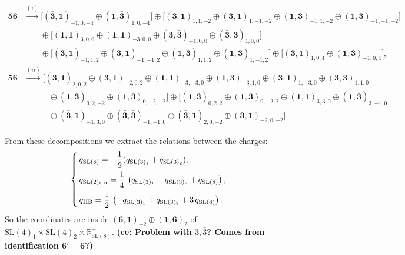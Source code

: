 \documentclass[11pt]{article}
\newcommand{\SL}{\ensuremath{\mathrm{SL}}\xspace}
\newcommand{\R}{\ensuremath{\mathbb{R}}\xspace}
\newcommand{\ce}[1]{\marginpar{\parbox{\marginparwidth}{\boldmath $\Longleftarrow$}}
{\boldmath\bfseries (ce: #1)}}
\begin{document}
  \begin{equation}
    \begin{aligned}
    \bm{56} &\overset{(i)}{\longrightarrow} \Big[(\bm{\bar{3}},\bm{1})_{-1,0,-4} \oplus (\bm{1},\bm{\bar{3}})_{1,0,-4}\Big] \oplus \Big[(\bm{3},\bm{1})_{1,1,-2} \oplus (\bm{3},\bm{1})_{1,-1,-2} \oplus (\bm{1},\bm{3})_{-1,1,-2} \oplus (\bm{1},\bm{3})_{-1,-1,-2}\Big] \\
    &\qquad \oplus \Big[(\bm{1},\bm{1})_{3,0,0} \oplus (\bm{1},\bm{1})_{-3,0,0} \oplus (\bm{3},\bm{\bar{3}})_{-1,0,0} \oplus (\bm{\bar{3}},\bm{3})_{1,0,0}\Big] \\
    &\qquad \oplus \Big[(\bm{\bar{3}},\bm{1})_{-1,1,2} \oplus (\bm{\bar{3}},\bm{1})_{-1,-1,2} \oplus (\bm{1},\bm{\bar{3}})_{1,1,2} \oplus (\bm{1},\bm{\bar{3}})_{1,-1,2}\Big] \oplus \Big[(\bm{3},\bm{1})_{1,0,4} \oplus (\bm{1},\bm{3})_{-1,0,4}\Big],\\[10pt]
    \bm{56} &\overset{(ii)}{\longrightarrow} \Big[(\bm{\bar{3}},\bm{1})_{2,0,2} \oplus (\bm{3},\bm{1})_{-2,0,2} \oplus (\bm{1},\bm{1})_{-3,-3,0} \oplus (\bm{1},\bm{3})_{-3,1,0}\oplus (\bm{3},\bm{1})_{1,-3,0} \oplus (\bm{3},\bm{3})_{1,1,0}\\
      &\quad\qquad \oplus (\bm{1},\bm{\bar{3}})_{0,2,-2} \oplus (\bm{1},\bm{3})_{0,-2,-2}\Big] \oplus \Big[(\bm{1},\bm{\bar{3}})_{0,2,2} \oplus (\bm{1},\bm{3})_{0,-2,2} \oplus (\bm{1},\bm{1})_{3,3,0} \oplus (\bm{1},\bm{\bar{3}})_{3,-1,0}\\
      &\quad\qquad \oplus (\bm{\bar{3}},\bm{1})_{-1,3,0} \oplus (\bm{\bar{3}},\bm{\bar{3}})_{-1,-1,0} \oplus (\bm{\bar{3}},\bm{1})_{2,0,-2} \oplus (\bm{3},\bm{1})_{-2,0,-2}\Big].
    \end{aligned}
  \end{equation}

  From these decompositions we extract the relations between the charges:
  \begin{equation}
    \begin{cases}
    q_{\SL(6)} = -\dfrac{1}{2}(q_{\SL(3)_{1}}+q_{\SL(3)_{2}}), \\[7pt]
    q_{\SL(2)_{\rm IIB}} = \dfrac{1}{4}\,\left(q_{\SL(3)_{1}}-q_{\SL(3)_{2}}+q_{\SL(8)}\right), \\[7pt]
    q_{\rm IIB} = \dfrac{1}{2}\,\left(-q_{\SL(3)_{1}}+q_{\SL(3)_{2}}+3\,q_{\SL(8)}\right).
    \end{cases}
  \end{equation}
  So the coordinates are inside $(\bm{6},\bm{1})_{-2}\oplus(\bm{1},\bm{6})_{2}$ of $\SL(4)_{1}\times\SL(4)_{2}\times\R^{+}_{\SL(8)}$. \ce{Problem with $3, \bar{3}$? Comes from identification $\bm{6'}=\bm{\bar{6}}$?}
\end{document}
